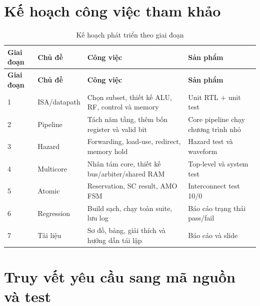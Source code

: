 \section{Kế hoạch công việc tham khảo}

\begin{longtable}{p{} p{} p{} p{}}
\caption{Kế hoạch phát triển theo giai đoạn}\label{tab:work_plan}\\
\toprule
\textbf{Giai đoạn} & \textbf{Chủ đề} & \textbf{Công việc} & \textbf{Sản phẩm} \\
\midrule
\endfirsthead
\toprule
\textbf{Giai đoạn} & \textbf{Chủ đề} & \textbf{Công việc} & \textbf{Sản phẩm} \\
\midrule
\endhead
1 & ISA/datapath & Chọn subset, thiết kế ALU, RF, control và memory & Unit RTL + unit test \\
2 & Pipeline & Tách năm tầng, thêm bốn register và valid bit & Core pipeline chạy chương trình nhỏ \\
3 & Hazard & Forwarding, load-use, redirect, memory hold & Hazard test và waveform \\
4 & Multicore & Nhân tám core, thiết kế bus/arbiter/shared RAM & Top-level và system test \\
5 & Atomic & Reservation, SC result, AMO FSM & Interconnect test 10/0 \\
6 & Regression & Build sạch, chạy toàn suite, lưu log & Báo cáo trạng thái pass/fail \\
7 & Tài liệu & Sơ đồ, bảng, giải thích và hướng dẫn tái lập & Báo cáo và slide \\
\bottomrule
\end{longtable}

\section{Truy vết yêu cầu sang mã nguồn và test}

